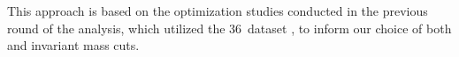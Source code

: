 This approach is based on the optimization studies conducted in the previous round of the analysis, which utilized the 36 \,\ifb dataset \cite{Ryzhov:2310214}, to inform our choice of both \pT and invariant mass cuts.



